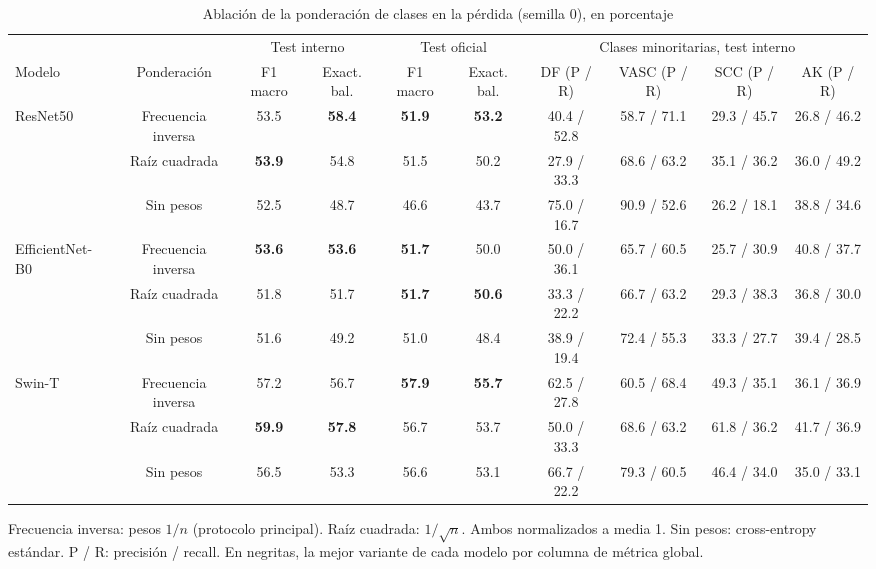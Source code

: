 \documentclass[conference]{IEEEtran}
\begin{document}
\begin{table}[!t]
\centering
\caption{Ablación de la ponderación de clases en la pérdida (semilla 0), en porcentaje}
\label{tab:ablacion}
\footnotesize
\setlength{\tabcolsep}{3pt}
\begin{tabular}{lccccccccc}
\toprule
 &  & \multicolumn{2}{c}{Test interno} & \multicolumn{2}{c}{Test oficial} & \multicolumn{4}{c}{Clases minoritarias, test interno} \\
\cmidrule(lr){3-4} \cmidrule(lr){5-6} \cmidrule(lr){7-10}
Modelo & Ponderación & F1 macro & Exact. bal. & F1 macro & Exact. bal. & DF (P / R) & VASC (P / R) & SCC (P / R) & AK (P / R) \\
\midrule
ResNet50 & Frecuencia inversa & 53.5 & \textbf{58.4} & \textbf{51.9} & \textbf{53.2} & 40.4 / 52.8 & 58.7 / 71.1 & 29.3 / 45.7 & 26.8 / 46.2 \\
 & Raíz cuadrada & \textbf{53.9} & 54.8 & 51.5 & 50.2 & 27.9 / 33.3 & 68.6 / 63.2 & 35.1 / 36.2 & 36.0 / 49.2 \\
 & Sin pesos & 52.5 & 48.7 & 46.6 & 43.7 & 75.0 / 16.7 & 90.9 / 52.6 & 26.2 / 18.1 & 38.8 / 34.6 \\
\midrule
EfficientNet-B0 & Frecuencia inversa & \textbf{53.6} & \textbf{53.6} & \textbf{51.7} & 50.0 & 50.0 / 36.1 & 65.7 / 60.5 & 25.7 / 30.9 & 40.8 / 37.7 \\
 & Raíz cuadrada & 51.8 & 51.7 & \textbf{51.7} & \textbf{50.6} & 33.3 / 22.2 & 66.7 / 63.2 & 29.3 / 38.3 & 36.8 / 30.0 \\
 & Sin pesos & 51.6 & 49.2 & 51.0 & 48.4 & 38.9 / 19.4 & 72.4 / 55.3 & 33.3 / 27.7 & 39.4 / 28.5 \\
\midrule
Swin-T & Frecuencia inversa & 57.2 & 56.7 & \textbf{57.9} & \textbf{55.7} & 62.5 / 27.8 & 60.5 / 68.4 & 49.3 / 35.1 & 36.1 / 36.9 \\
 & Raíz cuadrada & \textbf{59.9} & \textbf{57.8} & 56.7 & 53.7 & 50.0 / 33.3 & 68.6 / 63.2 & 61.8 / 36.2 & 41.7 / 36.9 \\
 & Sin pesos & 56.5 & 53.3 & 56.6 & 53.1 & 66.7 / 22.2 & 79.3 / 60.5 & 46.4 / 34.0 & 35.0 / 33.1 \\
\bottomrule
\end{tabular}
\par\vspace{2pt}
\parbox{\textwidth}{\scriptsize Frecuencia inversa: pesos $1/n$ (protocolo principal). Raíz cuadrada: $1/\sqrt{n}$. Ambos normalizados a media 1. Sin pesos: cross-entropy estándar. P / R: precisión / recall. En negritas, la mejor variante de cada modelo por columna de métrica global.}
\end{table}
\end{document}
